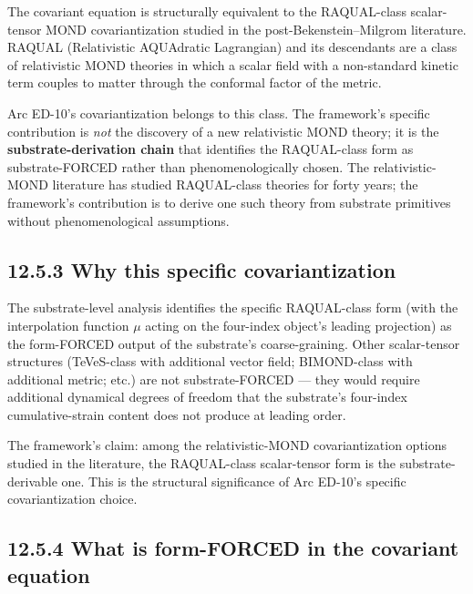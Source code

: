 \documentclass[11pt]{book}
\begin{document}
The covariant equation is structurally equivalent to the RAQUAL-class scalar-tensor MOND covariantization studied in the post-Bekenstein–Milgrom literature. RAQUAL (Relativistic AQUAdratic Lagrangian) and its descendants are a class of relativistic MOND theories in which a scalar field with a non-standard kinetic term couples to matter through the conformal factor of the metric.

Arc ED-10's covariantization belongs to this class. The framework's specific contribution is \textit{not} the discovery of a new relativistic MOND theory; it is the \textbf{substrate-derivation chain} that identifies the RAQUAL-class form as substrate-FORCED rather than phenomenologically chosen. The relativistic-MOND literature has studied RAQUAL-class theories for forty years; the framework's contribution is to derive one such theory from substrate primitives without phenomenological assumptions.

\subsection{12.5.3 Why this specific covariantization}

The substrate-level analysis identifies the specific RAQUAL-class form (with the interpolation function $\mu$ acting on the four-index object's leading projection) as the form-FORCED output of the substrate's coarse-graining. Other scalar-tensor structures (TeVeS-class with additional vector field; BIMOND-class with additional metric; etc.) are not substrate-FORCED — they would require additional dynamical degrees of freedom that the substrate's four-index cumulative-strain content does not produce at leading order.

The framework's claim: among the relativistic-MOND covariantization options studied in the literature, the RAQUAL-class scalar-tensor form is the substrate-derivable one. This is the structural significance of Arc ED-10's specific covariantization choice.

\subsection{12.5.4 What is form-FORCED in the covariant equation}
\end{document}
